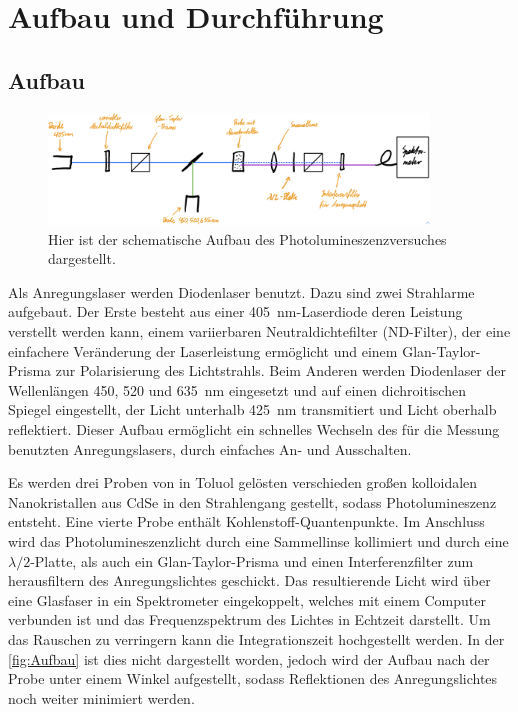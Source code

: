 \newpage
\section{Aufbau und Durchführung}
\subsection{Aufbau}
\label{sec:Aufbau}
    \begin{figure}[ht]
        \centering\captionsetup{format=plain}
        \includegraphics[width=0.9\textwidth]{bilder/Aufbau.jpeg}
        \caption{Hier ist der schematische Aufbau des Photolumineszenzversuches dargestellt. \cite{anleitung}}
        \label{fig:Aufbau}
    \end{figure}
    \FloatBarrier
    Als Anregungslaser werden Diodenlaser benutzt.
    Dazu sind zwei Strahlarme aufgebaut.
    Der Erste besteht aus einer \qty{405}{nm}-Laserdiode deren Leistung verstellt werden kann, einem variierbaren Neutraldichtefilter (ND-Filter), der eine einfachere Veränderung der Laserleistung ermöglicht und einem Glan-Taylor-Prisma zur Polarisierung des Lichtstrahls.
    Beim Anderen werden Diodenlaser der Wellenlängen 450, 520 und \qty{635}{nm} eingesetzt und auf einen dichroitischen Spiegel eingestellt, der Licht unterhalb \qty{425}{nm} transmitiert und Licht oberhalb reflektiert.
    Dieser Aufbau ermöglicht ein schnelles Wechseln des für die Messung benutzten Anregungslasers, durch einfaches An- und Ausschalten.

    Es werden drei Proben von in Toluol gelösten verschieden großen kolloidalen Nanokristallen aus CdSe in den Strahlengang gestellt, sodass Photolumineszenz entsteht.
    Eine vierte Probe enthält Kohlenstoff-Quantenpunkte.
    Im Anschluss wird das Photolumineszenzlicht durch eine Sammellinse kollimiert und durch eine $\lambda/2$-Platte, als auch ein Glan-Taylor-Prisma und einen Interferenzfilter zum herausfiltern des Anregungslichtes geschickt.
    Das resultierende Licht wird über eine Glasfaser in ein Spektrometer eingekoppelt, welches mit einem Computer verbunden ist und das Frequenzspektrum des Lichtes in Echtzeit darstellt.
    Um das Rauschen zu verringern kann die Integrationszeit hochgestellt werden.
    In der \autoref{fig:Aufbau} ist dies nicht dargestellt worden, jedoch wird der Aufbau nach der Probe unter einem Winkel aufgestellt, sodass Reflektionen des Anregungslichtes noch weiter minimiert werden.
    
